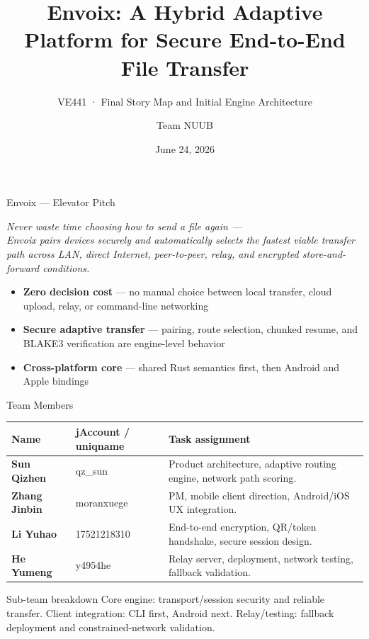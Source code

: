 \documentclass[xcolor=table,dvipsnames,svgnames,aspectratio=169]{beamer}
\title[Envoix · Story Map]%
  {\textbf{Envoix}: A Hybrid Adaptive Platform for Secure End-to-End File Transfer}
\subtitle{VE441 · Final Story Map and Initial Engine Architecture}
\author{Team NUUB}
\institute[SJTU GC]{Shanghai Jiao Tong University Global College}
\date{June 24, 2026}
\newcommand{\tightitems}{\setlength{\itemsep}{0.25em}\setlength{\parskip}{0em}}
\begin{document}
\maketitle

\begin{frame}[shrink=5]{Envoix --- Elevator Pitch}
  \begin{block}{}
    \centering\large\itshape
    Never waste time choosing how to send a file again ---\\
    Envoix pairs devices securely and automatically selects the fastest viable
    transfer path across LAN, direct Internet, peer-to-peer, relay, and
    encrypted store-and-forward conditions.
  \end{block}

  \vspace{1.0em}

  \begin{itemize}\tightitems
    \item \textbf{Zero decision cost} --- no manual choice between local transfer, cloud upload, relay, or command-line networking
    \item \textbf{Secure adaptive transfer} --- pairing, route selection, chunked resume, and BLAKE3 verification are engine-level behavior
    \item \textbf{Cross-platform core} --- shared Rust semantics first, then Android and Apple bindings
  \end{itemize}
\end{frame}

\begin{frame}{Team Members }
\small
\renewcommand{\arraystretch}{1.14}
\begin{tabularx}{\textwidth}{@{}>{\bfseries}l l X@{}}
  \toprule
  Name & jAccount / uniqname & Task assignment \\
  \midrule
  Sun Qizhen & qz\_sun & Product architecture, adaptive routing engine, network path scoring. \\
  Zhang Jinbin & moranxuege & PM, mobile client direction, Android/iOS UX integration. \\
  Li Yuhao & 17521218310 & End-to-end encryption, QR/token handshake, secure session design. \\
  He Yumeng & y4954he & Relay server, deployment, network testing, fallback validation. \\
  \bottomrule
\end{tabularx}

\vspace{0.18em}
\begin{block}{Sub-team breakdown}
\footnotesize
Core engine: transport/session security and reliable transfer. Client integration:
CLI first, Android next. Relay/testing: fallback deployment and constrained-network validation.
\end{block}
\end{frame}
\end{document}
